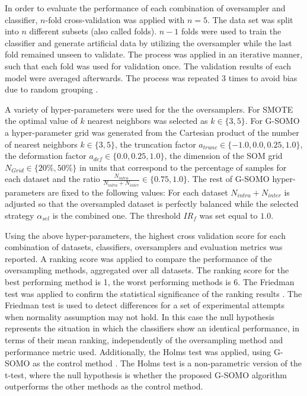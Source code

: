 \documentclass[parskip=full]{scrartcl}
\begin{document}
In order to evaluate the performance of each combination of oversampler and classifier, $n$-fold cross-validation was applied with $n = 5$. The data set was split into $n$ different subsets (also called folds). $n-1$ folds were used to train the classifier and generate artificial data by utilizing the oversampler while the last fold remained unseen to validate. The process was applied in an iterative manner, such that each fold was used for validation once. The validation results of each model were averaged afterwards. The process was repeated 3 times to avoid bias due to random grouping \cite{Japkowicz2013}.

A variety of hyper-parameters were used for the the oversamplers. For SMOTE the optimal value of $k$ nearest neighbors was selected as $k \in \{3, 5 \}$. For G-SOMO a hyper-parameter grid was generated from the Cartesian product of the number of nearest neighbors $k \in \{3, 5\} $, the truncation factor $ a_{trunc} \in \{-1.0, 0.0, 0.25, 1.0\} $, the deformation factor $ a_{def} \in \{0.0, 0.25, 1.0\} $, the dimension of the SOM grid $ N_{Grid} \in \{20\%, 50\% \} $ in units that correspond to the percentage of samples for each dataset and the ratio $ \frac{N_{intra}}{N_{intra} + N_{inter}} \in \{0.75, 1.0 \} $. The rest of G-SOMO hyper-parameters are fixed to the following values: For each dataset $ N_{intra} + N_{inter} $ is adjusted so that the oversampled dataset is perfectly balanced while the selected strategy $ \alpha_{sel} $ is the combined one. The threshold $ IR_{f} $ was set equal to $ 1.0 $.

Using the above hyper-parameters, the highest cross validation score for each combination of datasets, classifiers, oversamplers and evaluation metrics was reported. A ranking score was applied to compare the performance of the oversampling methods, aggregated over all datasets. The ranking score for the best performing method is 1, the worst performing methods is 6. The Friedman test was applied to confirm the statistical significance of the ranking results \cite{Guyon2003}. The Friedman test is used to detect differences for a set of experimental attempts when normality assumption may not hold. In this case the null hypothesis represents the situation in which the classifiers show an identical performance, in terms of their mean ranking, independently of the oversampling method and performance metric used. Additionally, the Holms test was applied, using G-SOMO as the control method \cite{Guyon2003}. The Holms test is a non-parametric version of the t-test, where the null hypothesis is whether the proposed G-SOMO algorithm outperforms the other methods as the control method.
\end{document}
